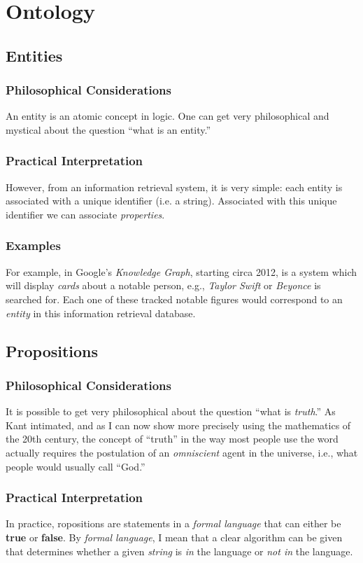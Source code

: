 \documentclass[12pt]{article}
\begin{document}
\section{Ontology}
\subsection{Entities}
\subsubsection{Philosophical Considerations}
An entity is an atomic concept in logic.
One can get very philosophical and mystical about the question ``what is an entity.''
\subsubsection{Practical Interpretation}
However, from an information retrieval system, it is very simple: each entity is associated with a unique identifier (i.e. a string).
Associated with this unique identifier we can associate {\em properties}.
\subsubsection{Examples}
For example, in Google's {\em Knowledge Graph}, starting circa 2012, is a system which will display {\em cards} about a notable person, e.g., {\em Taylor Swift} or {\em Beyonce} is searched for.
Each one of these tracked notable figures would correspond to an {\em entity} in this information retrieval database.

\subsection{Propositions}
\subsubsection{Philosophical Considerations}
It is possible to get very philosophical about the question ``what is {\em truth}.''
As Kant intimated, and as I can now show more precisely using the mathematics of the 20th century, the concept of ``truth'' in the way most people use the word actually requires the postulation of an {\em omniscient} agent in the universe, i.e., what people would usually call ``God.''
\subsubsection{Practical Interpretation}
In practice, ropositions are statements in a {\em formal language} that can either be {\bf true} or {\bf false}.
By {\em formal language}, I mean that a clear algorithm can be given that determines whether a given {\em string} is {\em in} the language or {\em not in} the language.
\end{document}
